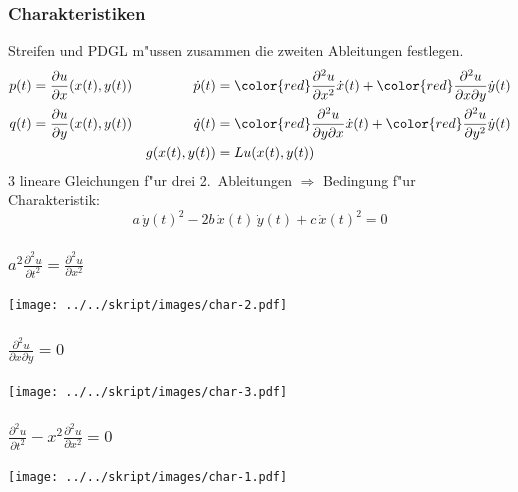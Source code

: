 \documentclass{beamer}
\begin{document}
\begin{frame}
\frametitle{Charakteristiken}

Streifen und PDGL m"ussen zusammen die zweiten Ableitungen festlegen.
\begin{align*}
p(t)&=\frac{\partial u}{\partial x}(x(t), y(t))
&
\dot p(t)
&={\color{red} \frac{\partial^2 u}{\partial x^2}}\dot x(t)
+
{\color{red}\frac{\partial^2u}{\partial x\partial y}}\dot y(t)
\\
q(t)&=\frac{\partial u}{\partial y}(x(t), y(t))
&
\dot q(t)
&=
{\color{red}\frac{\partial^2 u}{\partial y\partial x}}\dot x(t)
+
{\color{red}\frac{\partial^2u}{\partial y^2}}\dot y(t)
\\
&&g(x(t),y(t))&=Lu (x(t),y(t))
\end{align*}
3 lineare Gleichungen f"ur drei 2.~Ableitungen
$\Rightarrow$
Bedingung f"ur Charakteristik:
\[
a\,\dot y(t)^2-2b\,\dot x(t)\,\dot y(t)+c\,\dot x(t)^2=0
\]
\end{frame}

\begin{frame}
\frametitle{$\displaystyle a^2\frac{\partial^2u}{\partial t^2}=\frac{\partial^2u}{\partial x^2}$}
\pause
\begin{center}
\texttt{[image: ../../skript/images/char-2.pdf]}
\end{center}
\end{frame}

\begin{frame}
\frametitle{$\displaystyle \frac{\partial^2 u}{\partial x\partial y}=0$}
\pause
\begin{center}
\texttt{[image: ../../skript/images/char-3.pdf]}
\end{center}
\end{frame}

\begin{frame}
\frametitle{$\displaystyle \frac{\partial^2u}{\partial t^2}-x^2\frac{\partial^2 u}{\partial x^2}=0$}
\pause
\begin{center}
\texttt{[image: ../../skript/images/char-1.pdf]}
\end{center}
\end{frame}
\end{document}

